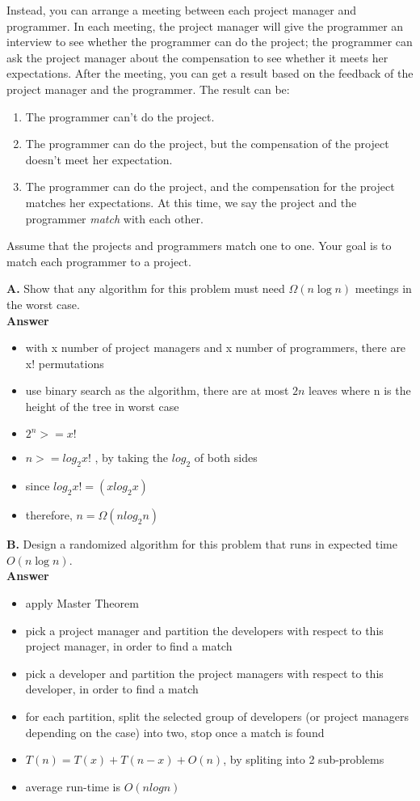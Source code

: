 \documentclass{article}
\begin{document}
Instead, you can arrange a meeting between each project manager and
programmer.  In each meeting, the project manager will give the
programmer an interview to see whether the programmer can do the
project; the programmer can ask the project manager about the
compensation to see whether it meets her expectations.  After the
meeting, you can get a result based on the feedback of the project
manager and the programmer.  The result can be:

\begin{enumerate}
  \item The programmer can't do the project.
  \item The programmer can do the project, but the compensation of the
    project doesn't meet her expectation.
  \item The programmer can do the project, and the compensation for
    the project matches her expectations. At this time, we say the
    project and the programmer \textit{match} with each other.
\end{enumerate}

Assume that the projects and programmers match one to one. Your goal
is to match each programmer to a project.

{\bf A.} Show that any algorithm for this problem must need $\Omega( n
\log{n} )$ meetings in the worst case.\\

\textbf{ Answer }
\begin{itemize}
\item with x number of project managers and x number of programmers, there are x! permutations
\item use binary search as the algorithm, there are at most $2n$ leaves where n is the height of the tree in worst case
\item $2^{n} >= x!$
\item $n >= log_{2}x!$	, by taking the $log_{2}$ of both sides
\item since $log_{2}x! = (x log_{2}x)$
\item therefore, $n = \Omega(n log_{2}n)$
\end{itemize}

{\bf B.}  Design a randomized algorithm for this problem that runs in
expected time $O ( n \log{n} )$.\\

\textbf{ Answer }
\begin{itemize}
\item apply Master Theorem
\item pick a project manager and partition the developers with respect to this project manager, in order to find a match
\item pick a developer and partition the project managers with respect to this developer, in order to find a match
\item for each partition, split the selected group of developers (or project managers depending on the case) into two, stop once a match is found
\item $T(n) = T(x) + T(n - x) + O(n)$, by spliting into 2 sub-problems
\item average run-time is $O(n log n)$
\end{itemize}
\end{document}
